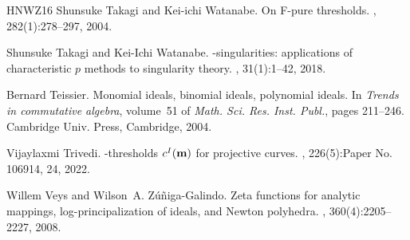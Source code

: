 \documentclass[12pt]{amsart}
\theoremstyle{definition}
\numberwithin{equation}{subsection}
\renewcommand{\!}[1]{{\color{red}\text{\Huge$\star$ }#1}}
\begin{document}
\begin{thebibliography}{HNWZ16}
	Shunsuke Takagi and Kei-ichi Watanabe.
	\newblock On {F}-pure thresholds.
	, 282(1):278--297, 2004.
	
	Shunsuke Takagi and Kei-Ichi Watanabe.
	-singularities: applications of characteristic {$p$} methods to
	singularity theory.
	, 31(1):1--42, 2018.
	
	Bernard Teissier.
	\newblock Monomial ideals, binomial ideals, polynomial ideals.
	\newblock In {\em Trends in commutative algebra}, volume~51 of {\em Math. Sci.
		Res. Inst. Publ.}, pages 211--246. Cambridge Univ. Press, Cambridge, 2004.
	
	Vijaylaxmi Trivedi.
	-thresholds {$c^ I({\bf m})$} for projective curves.
	, 226(5):Paper No. 106914, 24, 2022.
	
	Willem Veys and Wilson~A. {Z\'{u}{\~n}iga-Galindo}.
	\newblock Zeta functions for analytic mappings, log-principalization of ideals,
	and {N}ewton polyhedra.
	, 360(4):2205--2227, 2008.
	
\end{thebibliography}
\end{document}
